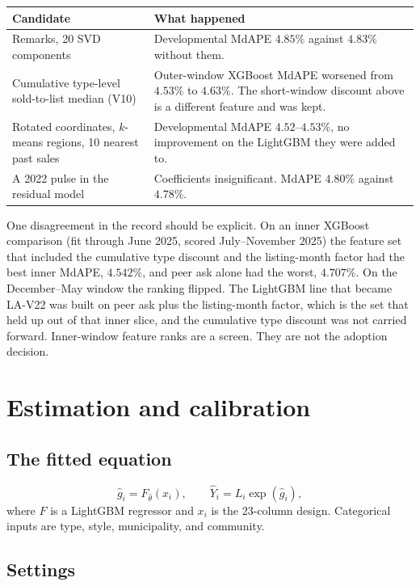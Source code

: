 \documentclass[11pt]{article}
\newcommand{\modelid}{LA-V22}
\begin{document}
\begin{center}
\small
\begin{tabular}{p{4.2cm}p{9.2cm}}
\toprule
Candidate & What happened \\
\midrule
Remarks, 20 SVD components & Developmental MdAPE \(4.85\%\) against \(4.83\%\) without them. \\
Cumulative type-level sold-to-list median (V10) & Outer-window XGBoost MdAPE worsened from \(4.53\%\) to \(4.63\%\). The short-window discount above is a different feature and was kept. \\
Rotated coordinates, \(k\)-means regions, 10 nearest past sales & Developmental MdAPE \(4.52\)--\(4.53\%\), no improvement on the LightGBM they were added to. \\
A 2022 pulse in the residual model & Coefficients insignificant. MdAPE \(4.80\%\) against \(4.78\%\). \\
\bottomrule
\end{tabular}
\end{center}

One disagreement in the record should be explicit. On an inner XGBoost comparison (fit through June 2025, scored July--November 2025) the feature set that included the cumulative type discount and the listing-month factor had the best inner MdAPE, \(4.542\%\), and peer ask alone had the worst, \(4.707\%\). On the December--May window the ranking flipped. The LightGBM line that became \modelid{} was built on peer ask plus the listing-month factor, which is the set that held up out of that inner slice, and the cumulative type discount was not carried forward. Inner-window feature ranks are a screen. They are not the adoption decision.

\section{Estimation and calibration}
\label{sec:calibration}

\subsection{The fitted equation}

\[
\hat g_i = F_{\hat\theta}(x_i), \qquad \hat Y_i = L_i \exp(\hat g_i),
\]
where \(F\) is a LightGBM regressor and \(x_i\) is the 23-column design. Categorical inputs are type, style, municipality, and community.

\subsection{Settings}
\end{document}
